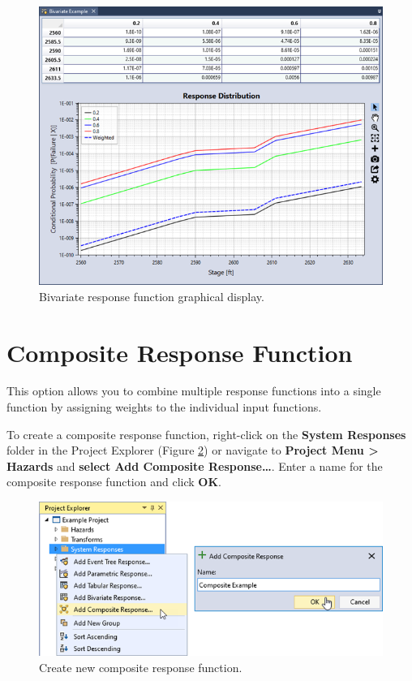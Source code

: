 \documentclass[
]{book}
\begin{document}
\begin{figure}

{\centering \includegraphics{images/figure108} 

}

\caption{Bivariate response function graphical display.}\label{fig:figure-108}
\end{figure}

\hypertarget{composite-response-function}{%
\section{Composite Response Function}\label{composite-response-function}}

This option allows you to combine multiple response functions into a single function by assigning weights to the individual input functions.

To create a composite response function, right-click on the \textbf{System Responses} folder in the Project Explorer (Figure \ref{fig:figure-109}) or navigate to \textbf{Project Menu \textgreater{} Hazards} and \textbf{select Add Composite Response\ldots{}}. Enter a name for the composite response function and click \textbf{OK}.

\begin{figure}

{\centering \includegraphics{images/figure109} 

}

\caption{Create new composite response function.}\label{fig:figure-109}
\end{figure}
\end{document}
